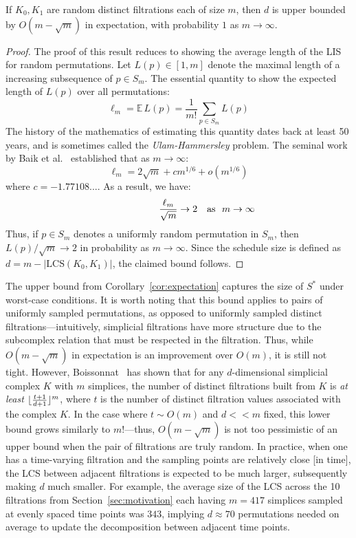 \documentclass{siamart190516}
\DeclarePairedDelimiter\floor{\lfloor}{\rfloor}
\begin{document}
\begin{corollary}\label{cor:expectation}
	If $K_0, K_1$ are random distinct filtrations each of size $m$, then $d$ is upper bounded by $O(m - \sqrt{m})$ in expectation, with probability $1$ as $m \to \infty$.
\end{corollary}
\begin{proof}
	The proof of this result reduces to showing the average length of the LIS for random permutations. Let $L(p) \in [1,m]$ denote the maximal length of a increasing subsequence of $p \in S_m$. 
	The essential quantity to show the expected length of $L(p)$ over all permutations: 
	$$ \ell_m = \mathbb{E} \, L(p) = \frac{1}{m!} \sum\limits_{p \in S_m} L(p)$$
	The history of the mathematics of estimating this quantity dates back at least 50 years, and is sometimes called the \emph{Ulam-Hammersley} problem. The seminal work by Baik et al.~\cite{baik1999distribution} established that as $m \to \infty$:
	$$ \displaystyle \ell_m = 2 \sqrt{m} + c m^{1/6} + o(m^{1/6}) $$
where $c = -1.77108...$. As a result, we have: 
$$ \frac{\ell_m}{\sqrt{m}} \to 2\rlap{\quad \text{as } $m \to \infty$} $$	 
Thus, if $p \in S_m$ denotes a uniformly random permutation in $S_m$, then $L(p)/\sqrt{m} \to 2$ in probability as $m \to \infty$. 
Since the schedule size is defined as $d = m - \lvert \mathrm{LCS}(K_0, K_1) \rvert$, the claimed bound follows.
\end{proof}
\noindent The upper bound from Corollary~\ref{cor:expectation} captures the size of $S^\ast$ under worst-case conditions. It is worth noting that this bound applies to pairs of uniformly sampled permutations, as opposed to uniformly sampled distinct filtrations---intuitively, simplicial filtrations have more structure due to the subcomplex relation that must be respected in the filtration. Thus, while $O(m - \sqrt{m})$ in expectation is an improvement over $O(m)$, it is still not tight. However, Boissonnat~\cite{boissonnat2018efficient} has shown that for any $d$-dimensional simplicial complex $K$ with $m$ simplices, the number of distinct filtrations built from $K$ is \emph{at least} $\floor{\frac{t+1}{d+1}}^m$, where $t$ is the number of distinct filtration values associated with the complex $K$. In the case where $t \sim O(m)$ and $d << m$ fixed, this lower bound grows similarly to $m!$---thus, $O(m - \sqrt{m})$ is not too pessimistic of an upper bound when the pair of filtrations are truly random. In practice, when one has a time-varying filtration and the sampling points are relatively close [in time], the LCS between adjacent filtrations is expected to be much larger, subsequently making $d$ much smaller. 
For example, the average size of the LCS across the 10 filtrations from Section~\ref{sec:motivation} each having $m=417$ simplices sampled at evenly spaced time points was $343$, implying $d \approx 70$ permutations needed on average to update the decomposition between adjacent time points.    
 
\end{document}

